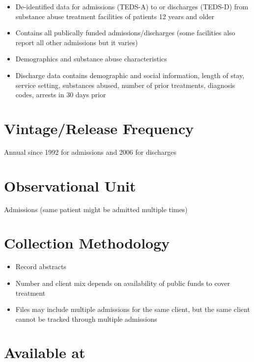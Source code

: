 \documentclass[
]{book}
\providecommand{\tightlist}{%
  \setlength{\itemsep}{0pt}\setlength{\parskip}{0pt}}
\begin{document}
\begin{itemize}
\tightlist
\item
  De-identified data for admissions (TEDS-A) to or discharges (TEDS-D) from substance abuse treatment facilities of patients 12 years and older
\item
  Contains all publically funded admissions/discharges (some facilities also report all other admissions but it varies)
\item
  Demographics and substance abuse characteristics
\item
  Discharge data contains demographic and social information, length of stay, service setting, substances abused, number of prior treatments, diagnosis codes, arrests in 30 days prior
\end{itemize}

\hypertarget{vintagerelease-frequency-89}{%
\section{Vintage/Release Frequency}\label{vintagerelease-frequency-89}}

Annual since 1992 for admissions and 2006 for discharges

\hypertarget{observational-unit-89}{%
\section{Observational Unit}\label{observational-unit-89}}

Admissions (same patient might be admitted multiple times)

\hypertarget{collection-methodology-89}{%
\section{Collection Methodology}\label{collection-methodology-89}}

\begin{itemize}
\tightlist
\item
  Record abstracts
\item
  Number and client mix depends on availability of public funds to cover treatment
\item
  Files may include multiple admissions for the same client, but the same client cannot be tracked through multiple admissions
\end{itemize}

\hypertarget{available-at-89}{%
\section{Available at}\label{available-at-89}}
\end{document}
